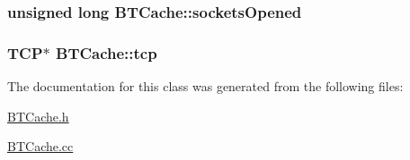 \subsubsection[{sockets\+Opened}]{\setlength{\rightskip}{0pt plus 5cm}unsigned long B\+T\+Cache\+::sockets\+Opened\hspace{0.3cm}{\ttfamily [protected]}}\label{classBTCache_ada2e7c16bb0919521475b4fd6014cd80}
\hypertarget{classBTCache_ae867f4ad74074c00b641e390d3a9e372}{}
\subsubsection[{tcp}]{\setlength{\rightskip}{0pt plus 5cm}T\+C\+P$\ast$ B\+T\+Cache\+::tcp\hspace{0.3cm}{\ttfamily [protected]}}\label{classBTCache_ae867f4ad74074c00b641e390d3a9e372}


The documentation for this class was generated from the following files\+:\begin{DoxyCompactItemize}
\item 
\hyperlink{BTCache_8h}{B\+T\+Cache.\+h}\item 
\hyperlink{BTCache_8cc}{B\+T\+Cache.\+cc}\end{DoxyCompactItemize}
